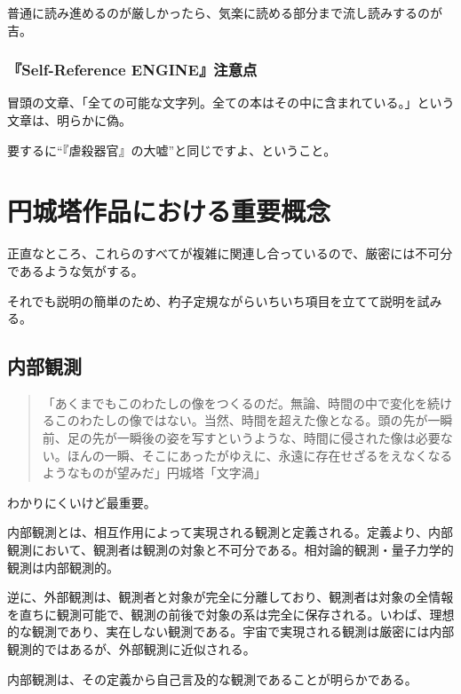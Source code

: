 \documentclass[10pt, a5paper, twoside]{jsarticle}
\begin{document}
				普通に読み進めるのが厳しかったら、気楽に読める部分まで流し読みするのが吉。

			\subsubsection*{『Self-Reference ENGINE』注意点}

				冒頭の文章、「全ての可能な文字列。全ての本はその中に含まれている。」という文章は、明らかに偽。

				要するに“『虐殺器官』の大嘘”と同じですよ、ということ。

	\section{円城塔作品における重要概念}

			正直なところ、これらのすべてが複雑に関連し合っているので、厳密には不可分であるような気がする。

			それでも説明の簡単のため、杓子定規ながらいちいち項目を立てて説明を試みる。

		\subsection{内部観測}

			\begin{quote}

				「あくまでもこのわたしの像をつくるのだ。無論、時間の中で変化を続けるこのわたしの像ではない。当然、時間を超えた像となる。頭の先が一瞬前、足の先が一瞬後の姿を写すというような、時間に侵された像は必要ない。ほんの一瞬、そこにあったがゆえに、永遠に存在せざるをえなくなるようなものが望みだ」\hspace{\fill}円城塔「文字渦」

			\end{quote}

			わかりにくいけど最重要。

			内部観測とは、相互作用によって実現される観測と定義される。定義より、内部観測において、観測者は観測の対象と不可分である。相対論的観測・量子力学的観測は内部観測的。

			逆に、外部観測は、観測者と対象が完全に分離しており、観測者は対象の全情報を直ちに観測可能で、観測の前後で対象の系は完全に保存される。いわば、理想的な観測であり、実在しない観測である。宇宙で実現される観測は厳密には内部観測的ではあるが、外部観測に近似される。

			内部観測は、その定義から自己言及的な観測であることが明らかである。
\end{document}
